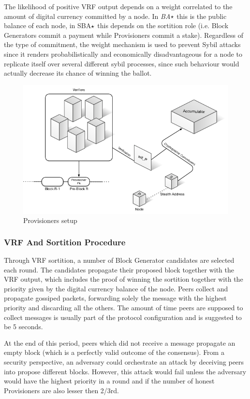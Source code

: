 The likelihood of positive VRF output depends on a weight correlated to the amount of digital currency committed by a node. In \textit{BA$\large\star$} this is the public balance of each node, in SBA$\large\star$ this depends on the sortition role (i.e. Block Generators commit a payment while Provisioners commit a stake). Regardless of the type of commitment, the weight mechanism is used to prevent Sybil attacks since it renders probabilistically and economically disadvantageous for a node to replicate itself over several different sybil processes, since such behaviour would actually decrease its chance of winning the ballot.

\begin{figure}
\includegraphics[scale=0.5]{Provisioners}
\caption{Provisioners setup}
\end{figure}

\subsubsection{VRF And Sortition Procedure}

Through VRF sortition, a number of Block Generator candidates are selected each round. The candidates propagate their proposed block together with the VRF output, which includes the proof of winning the sortition together with the priority given by the digital currency balance of the node. Peers collect and propagate gossiped packets, forwarding solely the message with the highest priority and discarding all the others. The amount of time peers are supposed to collect messages is usually part of the protocol configuration and is suggested to be 5 seconds.

At the end of this period, peers which did not receive a message propagate an empty block (which is a perfectly valid outcome of the consensus). From a security perspective, an adversary could orchestrate an attack by deceiving peers into propose different blocks. However, this attack would fail unless the adversary would have the highest priority in a round and if the number of honest Provisioners are also lesser then 2/3rd.

